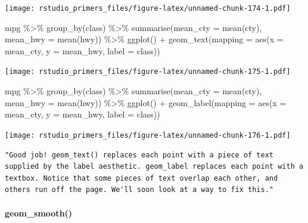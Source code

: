 \documentclass[
]{article}
\newenvironment{Shaded}{\begin{snugshade}}{\end{snugshade}}
\newcommand{\AttributeTok}[1]{\textcolor[rgb]{0.77,0.63,0.00}{#1}}
\newcommand{\FunctionTok}[1]{\textcolor[rgb]{0.00,0.00,0.00}{#1}}
\newcommand{\NormalTok}[1]{#1}
\newcommand{\SpecialCharTok}[1]{\textcolor[rgb]{0.00,0.00,0.00}{#1}}
\begin{document}
\texttt{[image: rstudio\_primers\_files/figure-latex/unnamed-chunk-174-1.pdf]}

\begin{Shaded}
\begin{Highlighting}[]
\NormalTok{mpg }\SpecialCharTok{\%\textgreater{}\%} 
  \FunctionTok{group\_by}\NormalTok{(class) }\SpecialCharTok{\%\textgreater{}\%} 
  \FunctionTok{summarise}\NormalTok{(}\AttributeTok{mean\_cty =} \FunctionTok{mean}\NormalTok{(cty), }\AttributeTok{mean\_hwy =} \FunctionTok{mean}\NormalTok{(hwy)) }\SpecialCharTok{\%\textgreater{}\%} 
  \FunctionTok{ggplot}\NormalTok{() }\SpecialCharTok{+}
    \FunctionTok{geom\_text}\NormalTok{(}\AttributeTok{mapping =} \FunctionTok{aes}\NormalTok{(}\AttributeTok{x =}\NormalTok{ mean\_cty, }\AttributeTok{y =}\NormalTok{ mean\_hwy, }\AttributeTok{label =}\NormalTok{ class))}
\end{Highlighting}
\end{Shaded}

\texttt{[image: rstudio\_primers\_files/figure-latex/unnamed-chunk-175-1.pdf]}

\begin{Shaded}
\begin{Highlighting}[]
\NormalTok{mpg }\SpecialCharTok{\%\textgreater{}\%} 
  \FunctionTok{group\_by}\NormalTok{(class) }\SpecialCharTok{\%\textgreater{}\%} 
  \FunctionTok{summarise}\NormalTok{(}\AttributeTok{mean\_cty =} \FunctionTok{mean}\NormalTok{(cty), }\AttributeTok{mean\_hwy =} \FunctionTok{mean}\NormalTok{(hwy)) }\SpecialCharTok{\%\textgreater{}\%} 
  \FunctionTok{ggplot}\NormalTok{() }\SpecialCharTok{+}
    \FunctionTok{geom\_label}\NormalTok{(}\AttributeTok{mapping =} \FunctionTok{aes}\NormalTok{(}\AttributeTok{x =}\NormalTok{ mean\_cty, }\AttributeTok{y =}\NormalTok{ mean\_hwy, }\AttributeTok{label =}\NormalTok{ class))}
\end{Highlighting}
\end{Shaded}

\texttt{[image: rstudio\_primers\_files/figure-latex/unnamed-chunk-176-1.pdf]}

\begin{verbatim}
"Good job! geom_text() replaces each point with a piece of text supplied by the label aesthetic. geom_label replaces each point with a textbox. Notice that some pieces of text overlap each other, and others run off the page. We'll soon look at a way to fix this."
\end{verbatim}

\hypertarget{geom_smooth}{%
\paragraph{geom\_smooth()}\label{geom_smooth}}
\end{document}
